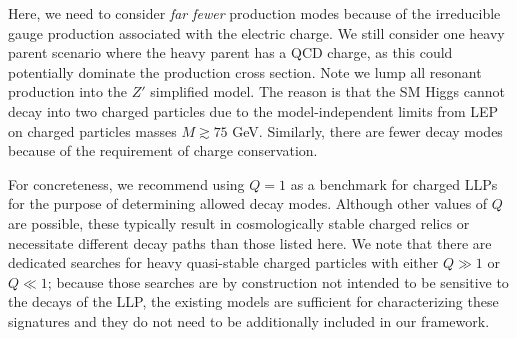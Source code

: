 Here, we need to consider \emph{far fewer} production modes because of the irreducible gauge production associated with the electric charge. We still consider one heavy parent scenario where the heavy parent has a QCD charge, as this could potentially dominate the production cross section. Note we lump all resonant production into the $Z'$ simplified model.  The reason is that the SM Higgs cannot decay into two charged particles due to the model-independent limits from LEP on charged particles masses $M\gtrsim75$ GeV.   Similarly, there are fewer decay modes because of the requirement of charge conservation.  %

For concreteness, we recommend using $Q=1$ as a benchmark for charged LLPs for the purpose of determining allowed decay modes. 
Although other values of $Q$ are possible, these typically result in cosmologically stable charged relics or necessitate different decay paths than those listed here.   
We note that there are dedicated searches for heavy quasi-stable charged particles with either $Q\gg1$ or $Q\ll1$; because those searches are by construction not intended to be sensitive to the decays of the LLP, the existing models are sufficient for characterizing these signatures and they do not need to be additionally included in our framework.


